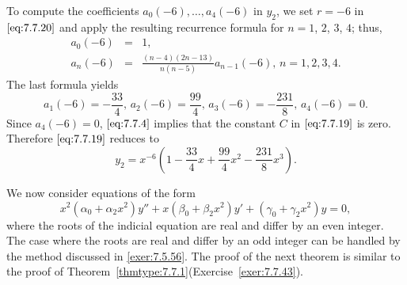 \documentclass{ximera}
\begin{document}
\begin{example}
\begin{explanation}
To compute the coefficients
$a_0(-6),\dots,a_4(-6)$ in $y_2$, we
set $r=-6$ in $\eqref{eq:7.7.20}$ and apply the resulting recurrence
formula for $n=1$, $2$, $3$, $4$;   thus,
\begin{eqnarray*}
a_0(-6)&=&1,\\
a_n(-6)&=&\frac{(n-4)(2n-13)}{n(n-5)}a_{n-1}(-6),\,n=1,2,3,4.
\end{eqnarray*}
The last formula yields
$$
a_1(-6)=-\frac{33}{4},\,a_2(-6)=\frac{99}{4},\,a_3(-6)=-\frac{231}{8},\,a_4(-6)=0.
$$
Since $a_4(-6)=0$, $\eqref{eq:7.7.4}$ implies that the constant $C$
in $\eqref{eq:7.7.19}$ is zero. Therefore $\eqref{eq:7.7.19}$ reduces
to
$$
y_2=x^{-6}\left(1-\frac{33}{4}x+\frac{99}{4}x^2-\frac{231}{8}x^3\right).
$$
\end{explanation}
\end{example}

We now consider   equations  of the form
$$
x^2(\alpha_0+\alpha_2x^2)y''+x(\beta_0+\beta_2x^2)y'
+(\gamma_0+\gamma_2x^2)y=0,
$$
where the roots of the indicial equation are real and differ by an
even integer. 
The case where the roots are real and differ by an odd
integer can be handled by the method discussed in
\ref{exer:7.5.56}.
The proof of the next theorem is similar to the proof of
Theorem~\ref{thmtype:7.7.1}(Exercise~\ref{exer:7.7.43}).
\end{document}
